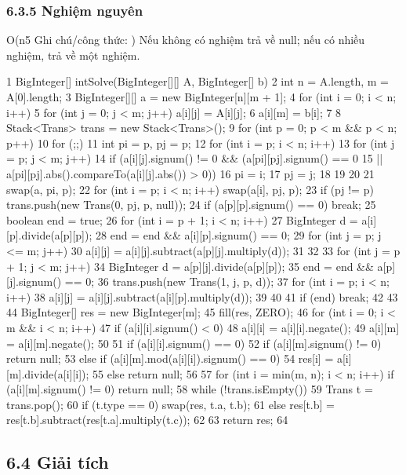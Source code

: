 \documentclass[11pt]{article}
\begin{document}
\subsubsection{6.3.5 Nghiệm nguyên}
\begin{NoteBlock}
O(n5
Ghi chú/công thức: )
Nếu không có nghiệm trả về null; nếu có nhiều nghiệm, trả về một nghiệm.
\end{NoteBlock}
\begin{Code}
1 BigInteger[] intSolve(BigInteger[][] A, BigInteger[] b) {
2 int n = A.length, m = A[0].length;
3 BigInteger[][] a = new BigInteger[n][m + 1];
4 for (int i = 0; i < n; i++) {
5 for (int j = 0; j < m; j++) a[i][j] = A[i][j];
6 a[i][m] = b[i];
7 }
8 Stack<Trans> trans = new Stack<Trans>();
9 for (int p = 0; p < m && p < n; p++) {
10 for (;;) {
11 int pi = p, pj = p;
12 for (int i = p; i < n; i++) {
13 for (int j = p; j < m; j++) {
14 if (a[i][j].signum() != 0 && (a[pi][pj].signum() == 0
15 || a[pi][pj].abs().compareTo(a[i][j].abs()) > 0)) {
16 pi = i;
17 pj = j;
18 }
19 }
20 }
21 swap(a, pi, p);
22 for (int i = p; i < n; i++) swap(a[i], pj, p);
23 if (pj != p) trans.push(new Trans(0, pj, p, null));
24 if (a[p][p].signum() == 0) break;
25 boolean end = true;
26 for (int i = p + 1; i < n; i++) {
27 BigInteger d = a[i][p].divide(a[p][p]);
28 end = end && a[i][p].signum() == 0;
29 for (int j = p; j <= m; j++) {
30 a[i][j] = a[i][j].subtract(a[p][j].multiply(d));
31 }
32 }
33 for (int j = p + 1; j < m; j++) {
34 BigInteger d = a[p][j].divide(a[p][p]);
35 end = end && a[p][j].signum() == 0;
36 trans.push(new Trans(1, j, p, d));
37 for (int i = p; i < n; i++) {
38 a[i][j] = a[i][j].subtract(a[i][p].multiply(d));
39 }
40 }
41 if (end) break;
42 }
43 }
44 BigInteger[] res = new BigInteger[m];
45 fill(res, ZERO);
46 for (int i = 0; i < m && i < n; i++) {
47 if (a[i][i].signum() < 0) {
48 a[i][i] = a[i][i].negate();
49 a[i][m] = a[i][m].negate();
50 }
51 if (a[i][i].signum() == 0) {
52 if (a[i][m].signum() != 0) return null;
53 } else if (a[i][m].mod(a[i][i]).signum() == 0) {
54 res[i] = a[i][m].divide(a[i][i]);
55 } else return null;
56 }
57 for (int i = min(m, n); i < n; i++) if (a[i][m].signum() != 0) return null;
58 while (!trans.isEmpty()) {
59 Trans t = trans.pop();
60 if (t.type == 0) swap(res, t.a, t.b);
61 else res[t.b] = res[t.b].subtract(res[t.a].multiply(t.c));
62 }
63 return res;
64 }
\end{Code}
\subsection{6.4 Giải tích}
\end{document}

